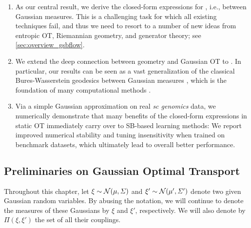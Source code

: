 \begin{enumerate}[leftmargin=.4cm,itemsep=.0cm,topsep=.0cm]
\item As our central result, we derive the closed-form expressions for , i.e.,  between Gaussian measures. This is a challenging task for which all existing techniques fail, and thus we need to resort to a number of new ideas from entropic \acrshort{OT}, Riemannian geometry, and generator theory; see \cref{sec:overview_gsbflow}.

\item We extend the deep connection between geometry and Gaussian \acrshort{OT} to . In particular, our results can be seen as a vast generalization of the classical Bures-Wasserstein geodesics between Gaussian measures \citep{takatsu2010wasserstein, bhatia2019bures}, which is the foundation of many computational methods \citep{chewi2020gradient, altschuler2021averaging, han2021riemannian}.

\item Via a simple Gaussian approximation on real \emph{\acrlong{sc} genomics} data, we numerically demonstrate that many benefits of the closed-form expressions in static \acrshort{OT} immediately carry over to \acrshort{SB}-based learning methods: We report improved numerical stability and tuning insensitivity when trained on benchmark datasets, which ultimately lead to overall better performance.
\end{enumerate}

\subsection{Preliminaries on Gaussian Optimal Transport}
\label{sec:prelim_gsbflow}

Throughout this chapter, let $\xi \sim \mathcal{N}(\mu, \Sigma)$ and $\xi' \sim \mathcal{N}(\mu', \Sigma')$ denote two given Gaussian random variables. By abusing the notation, we will continue to denote the measures of these Gaussians by $\xi$ and $\xi'$, respectively. We will also denote by $\Pi(\xi,\xi')$ the set of all their couplings. 

